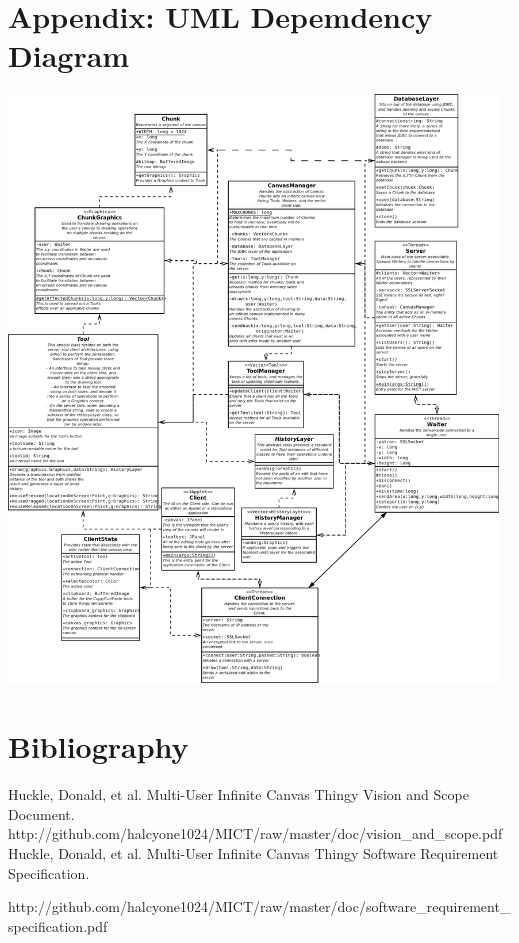 \documentclass[11pt,oneside,a4paper]{article}
\begin{document}
\section{Appendix: UML Depemdency Diagram}
 \begin{center}
  \includegraphics[width=130mm]{design_spec_appendix.png}
 \end{center}
\section{Bibliography}
Huckle, Donald, et al. Multi-User Infinite Canvas Thingy Vision and
Scope Document. http://github.com/halcyone1024/MICT/raw/master/doc/vision\_and\_scope.pdf
Huckle, Donald, et al. Multi-User Infinite Canvas Thingy Software Requirement
Specification.

http://github.com/halcyone1024/MICT/raw/master/doc/software\_requirement\_specification.pdf
\end{document}
